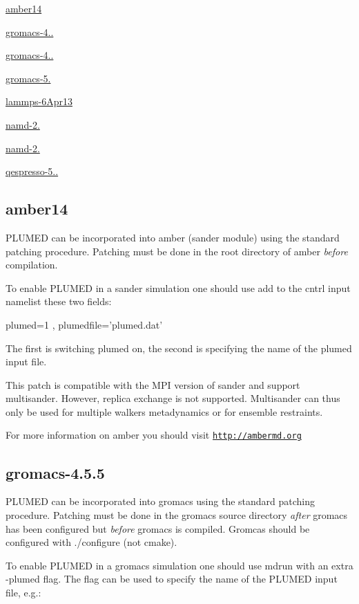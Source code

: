 \begin{DoxyItemize}
\item \hyperlink{amber14}{amber14}
\item \hyperlink{gromacs-4-5-5}{gromacs-\/4..}
\item \hyperlink{gromacs-4-6-7}{gromacs-\/4..}
\item \hyperlink{gromacs-5-0}{gromacs-\/5.}
\item \hyperlink{lammps-6Apr13}{lammps-\/6\+Apr13}
\item \hyperlink{namd-2-8}{namd-\/2.}
\item \hyperlink{namd-2-9}{namd-\/2.}
\item \hyperlink{qespresso-5-0-2}{qespresso-\/5..} 
\end{DoxyItemize}\hypertarget{amber14}{}\subsection{amber14}\label{amber14}
P\+L\+U\+M\+E\+D can be incorporated into amber (sander module) using the standard patching procedure. Patching must be done in the root directory of amber {\itshape before} compilation.

To enable P\+L\+U\+M\+E\+D in a sander simulation one should use add to the cntrl input namelist these two fields\+:

plumed=1 , plumedfile='plumed.\+dat'

The first is switching plumed on, the second is specifying the name of the plumed input file.

This patch is compatible with the M\+P\+I version of sander and support multisander. However, replica exchange is not supported. Multisander can thus only be used for multiple walkers metadynamics or for ensemble restraints.

For more information on amber you should visit \href{http://ambermd.org}{\tt http\+://ambermd.\+org} \hypertarget{gromacs-4-5-5}{}\subsection{gromacs-\/4.5.5}\label{gromacs-4-5-5}
P\+L\+U\+M\+E\+D can be incorporated into gromacs using the standard patching procedure. Patching must be done in the gromacs source directory {\itshape after} gromacs has been configured but {\itshape before} gromacs is compiled. Gromcas should be configured with ./configure (not cmake).

To enable P\+L\+U\+M\+E\+D in a gromacs simulation one should use mdrun with an extra -\/plumed flag. The flag can be used to specify the name of the P\+L\+U\+M\+E\+D input file, e.\+g.\+:

